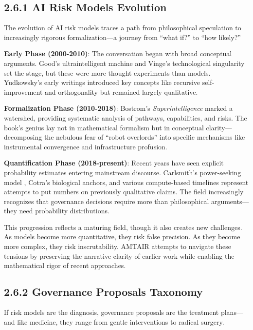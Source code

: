 \documentclass[
  11pt,
  letterpaper,
]{book}
\begin{document}
\subsection{2.6.1 AI Risk Models
Evolution}\label{sec-risk-models-evolution}

The evolution of AI risk models traces a path from philosophical
speculation to increasingly rigorous formalization---a journey from
``what if?'' to ``how likely?''

\textbf{Early Phase (2000-2010)}: The conversation began with broad
conceptual arguments. Good's ultraintelligent machine
\textcite{good1966} and Vinge's technological singularity set the stage,
but these were more thought experiments than models. Yudkowsky's early
writings \textcite{yudkowsky2008} introduced key concepts like recursive
self-improvement and orthogonality but remained largely qualitative.

\textbf{Formalization Phase (2010-2018)}: Bostrom's
\emph{Superintelligence} \textcite{bostrom2014} marked a watershed,
providing systematic analysis of pathways, capabilities, and risks. The
book's genius lay not in mathematical formalism but in conceptual
clarity---decomposing the nebulous fear of ``robot overlords'' into
specific mechanisms like instrumental convergence and infrastructure
profusion.

\textbf{Quantification Phase (2018-present)}: Recent years have seen
explicit probability estimates entering mainstream discourse.
Carlsmith's power-seeking model \textcite{carlsmith2022}, Cotra's
biological anchors, and various compute-based timelines represent
attempts to put numbers on previously qualitative claims. The field
increasingly recognizes that governance decisions require more than
philosophical arguments---they need probability distributions.

This progression reflects a maturing field, though it also creates new
challenges. As models become more quantitative, they risk false
precision. As they become more complex, they risk inscrutability. AMTAIR
attempts to navigate these tensions by preserving the narrative clarity
of earlier work while enabling the mathematical rigor of recent
approaches.

\subsection{2.6.2 Governance Proposals
Taxonomy}\label{sec-governance-taxonomy}

If risk models are the diagnosis, governance proposals are the treatment
plans---and like medicine, they range from gentle interventions to
radical surgery.
\end{document}
